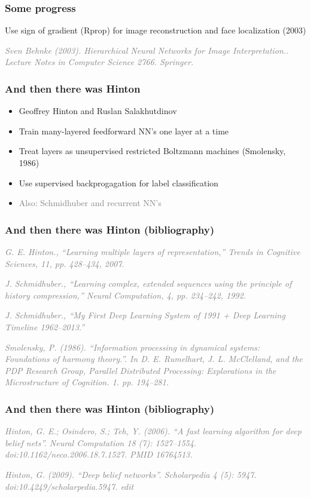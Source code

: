 \documentclass{beamer}
\newcommand\gray[1]{\textcolor{gray}{#1}}
\newcommand\smallgray[1]{\textcolor{gray}{\small\it #1}}
\newcommand\prevwork[1]{\smallgray{#1}}
\begin{document}
\begin{frame}
  \frametitle{Some progress}

  Use sign of gradient (Rprop) for image reconstruction and face
  localization (2003)

  \prevwork{Sven Behnke (2003). Hierarchical Neural Networks for Image
    Interpretation.. Lecture Notes in Computer Science
    2766. Springer.}
\end{frame}

\begin{frame}
  \frametitle{And then there was Hinton}
  \begin{itemize}
  \item Geoffrey Hinton and Ruslan Salakhutdinov
  \item Train many-layered feedforward NN's one layer at a time
  \item Treat layers as unsupervised restricted Boltzmann machines
    (Smolensky, 1986)
  \item Use supervised backprogagation for label classification
  \item \gray{Also: Schmidhuber and recurrent NN's}
  \end{itemize}
\end{frame}

\begin{frame}
  \frametitle{And then there was Hinton (bibliography)}

\prevwork{G. E. Hinton., ``Learning multiple layers of
  representation,'' Trends in Cognitive Sciences, 11, pp. 428–434,
  2007.}

\prevwork{J. Schmidhuber., ``Learning complex, extended sequences using
  the principle of history compression,'' Neural Computation, 4,
  pp. 234–242, 1992.}

\prevwork{J. Schmidhuber., ``My First Deep Learning System of 1991 +
  Deep Learning Timeline 1962–2013.''}

\prevwork{Smolensky, P. (1986). ``Information processing in dynamical
  systems: Foundations of harmony theory.''. In D. E. Rumelhart,
  J. L. McClelland, and the PDP Research Group, Parallel Distributed
  Processing: Explorations in the Microstructure of
  Cognition. 1. pp. 194–281.}
\end{frame}

\begin{frame}
  \frametitle{And then there was Hinton (bibliography)}

\prevwork{Hinton, G. E.; Osindero, S.; Teh, Y. (2006). ``A fast
  learning algorithm for deep belief nets''. Neural Computation 18 (7):
  1527–1554. doi:10.1162/neco.2006.18.7.1527. PMID 16764513.}

\prevwork{Hinton, G. (2009). ``Deep belief networks''. Scholarpedia 4
  (5): 5947. doi:10.4249/scholarpedia.5947. edit}
\end{frame}
\end{document}
